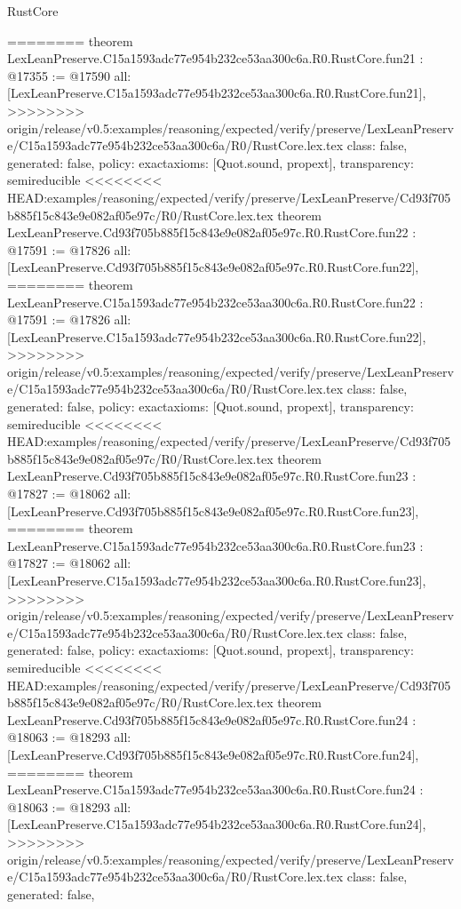 \begin{lexlean}{RustCore}
\begin{coremodule}
{\begin{coremodule}
{{{{{{{{{{{{{{{{{{{{{{{{========
theorem LexLeanPreserve.C15a1593adc77e954b232ce53aa300c6a.R0.RustCore.fun21 : @17355 := @17590 {
  all: [LexLeanPreserve.C15a1593adc77e954b232ce53aa300c6a.R0.RustCore.fun21],
>>>>>>>> origin/release/v0.5:examples/reasoning/expected/verify/preserve/LexLeanPreserve/C15a1593adc77e954b232ce53aa300c6a/R0/RustCore.lex.tex
  class: false,
  generated: false,
  policy: exact{axioms: [Quot.sound, propext]},
  transparency: semireducible
}
<<<<<<<< HEAD:examples/reasoning/expected/verify/preserve/LexLeanPreserve/Cd93f705b885f15c843e9e082af05e97c/R0/RustCore.lex.tex
theorem LexLeanPreserve.Cd93f705b885f15c843e9e082af05e97c.R0.RustCore.fun22 : @17591 := @17826 {
  all: [LexLeanPreserve.Cd93f705b885f15c843e9e082af05e97c.R0.RustCore.fun22],
========
theorem LexLeanPreserve.C15a1593adc77e954b232ce53aa300c6a.R0.RustCore.fun22 : @17591 := @17826 {
  all: [LexLeanPreserve.C15a1593adc77e954b232ce53aa300c6a.R0.RustCore.fun22],
>>>>>>>> origin/release/v0.5:examples/reasoning/expected/verify/preserve/LexLeanPreserve/C15a1593adc77e954b232ce53aa300c6a/R0/RustCore.lex.tex
  class: false,
  generated: false,
  policy: exact{axioms: [Quot.sound, propext]},
  transparency: semireducible
}
<<<<<<<< HEAD:examples/reasoning/expected/verify/preserve/LexLeanPreserve/Cd93f705b885f15c843e9e082af05e97c/R0/RustCore.lex.tex
theorem LexLeanPreserve.Cd93f705b885f15c843e9e082af05e97c.R0.RustCore.fun23 : @17827 := @18062 {
  all: [LexLeanPreserve.Cd93f705b885f15c843e9e082af05e97c.R0.RustCore.fun23],
========
theorem LexLeanPreserve.C15a1593adc77e954b232ce53aa300c6a.R0.RustCore.fun23 : @17827 := @18062 {
  all: [LexLeanPreserve.C15a1593adc77e954b232ce53aa300c6a.R0.RustCore.fun23],
>>>>>>>> origin/release/v0.5:examples/reasoning/expected/verify/preserve/LexLeanPreserve/C15a1593adc77e954b232ce53aa300c6a/R0/RustCore.lex.tex
  class: false,
  generated: false,
  policy: exact{axioms: [Quot.sound, propext]},
  transparency: semireducible
}
<<<<<<<< HEAD:examples/reasoning/expected/verify/preserve/LexLeanPreserve/Cd93f705b885f15c843e9e082af05e97c/R0/RustCore.lex.tex
theorem LexLeanPreserve.Cd93f705b885f15c843e9e082af05e97c.R0.RustCore.fun24 : @18063 := @18293 {
  all: [LexLeanPreserve.Cd93f705b885f15c843e9e082af05e97c.R0.RustCore.fun24],
========
theorem LexLeanPreserve.C15a1593adc77e954b232ce53aa300c6a.R0.RustCore.fun24 : @18063 := @18293 {
  all: [LexLeanPreserve.C15a1593adc77e954b232ce53aa300c6a.R0.RustCore.fun24],
>>>>>>>> origin/release/v0.5:examples/reasoning/expected/verify/preserve/LexLeanPreserve/C15a1593adc77e954b232ce53aa300c6a/R0/RustCore.lex.tex
  class: false,
  generated: false,
}}}}}}}}}}}}}}}}}}}}}}}}}}}}
\end{coremodule}}
\end{coremodule}
\end{lexlean}
